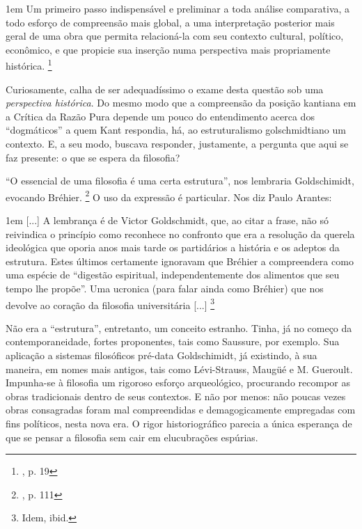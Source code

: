\documentclass[12pt,a4paper]{article}
\newenvironment{citac}{
	\begin{addmargin}[4cm]{1em} \footnotesize}{\normalfont \end{addmargin}
}
\begin{document}
	\begin{citac}
		Um primeiro passo indispensável e preliminar a toda análise 
		comparativa, a todo esforço de compreensão mais global, a 
		uma interpretação posterior mais geral de uma obra que 
		permita relacioná-la com seu contexto cultural, político, 
		econômico, e que propicie sua inserção numa perspectiva mais 
		propriamente histórica. \footnote{\cite{porchat}, p. 19} 
	\end{citac}

	Curiosamente, calha de ser adequadíssimo o exame desta questão sob 
	uma \textit{perspectiva histórica}. Do mesmo modo que a compreensão 
	da posição kantiana em a Crítica da Razão Pura depende um pouco do 
	entendimento acerca dos “dogmáticos” a quem Kant respondia, há, ao 
	estruturalismo golschmidtiano um contexto. E, a seu modo, buscava 
	responder, justamente, a pergunta que aqui se faz presente: o que 
	se espera da filosofia? 

	“O essencial de uma filosofia é uma certa estrutura”, nos lembraria 
	Goldschimidt, evocando Bréhier. \footnote{\cite{arantes}, p. 111}
	O uso da expressão é particular. Nos diz Paulo Arantes: 

	\begin{citac}
		[...] A lembrança é de Victor Goldschmidt, que, ao citar 
		a frase, não só reivindica o princípio como reconhece no 
		confronto que era a resolução da querela ideológica que 
		oporia anos mais tarde os partidários a história e os 
		adeptos da estrutura. Estes últimos certamente ignoravam 
		que Bréhier a compreendera como uma espécie de “digestão 
		espiritual, independentemente dos alimentos que seu tempo
		lhe propõe”. Uma ucronica (para falar ainda como Bréhier)
		que nos devolve ao coração da filosofia universitária [...]
		\footnote{Idem, ibid.}
	\end{citac}

	Não era a “estrutura”, entretanto, um conceito estranho. Tinha, 
	já no começo da contemporaneidade, fortes proponentes, tais como 
	Saussure, por exemplo. Sua aplicação a sistemas filosóficos 
	pré-data Goldschimidt, já existindo, à sua maneira, em nomes mais 
	antigos, tais como Lévi-Strauss, Maugüé e M. Gueroult. Impunha-se 
	à filosofia um rigoroso esforço arqueológico, procurando recompor 
	as obras tradicionais dentro de seus contextos. E não por menos: 
	não poucas vezes obras consagradas foram mal compreendidas e 
	demagogicamente empregadas com fins políticos, nesta nova era. 
	O rigor historiográfico parecia a única esperança de que se 
	pensar a filosofia sem cair em elucubrações espúrias.  
\end{document}

